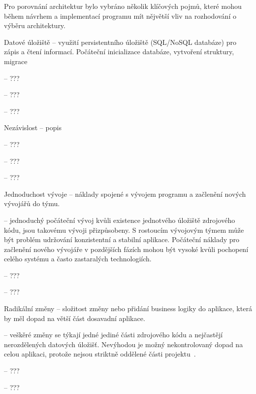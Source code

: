 Pro porovnání architektur bylo vybráno několik klíčových pojmů, které mohou během návrhem a implementací programu mít nějvětší vliv na rozhodování o výběru architektury.


\begin{dl}
   \item[Datové úložiště] – využití persistentního úložiště (SQL/NoSQL databáze) pro zápis a čtení informací.
   Počáteční inicializace databáze, vytvoření struktury, migrace
\end{dl}
\begin{ul}
   \item {} – ???
   \item {} – ???
   \item {} – ???
\end{ul}

\begin{dl}
   \item[Nezávislost] – popis
\end{dl}
\begin{ul}
   \item {} – ???
   \item {} – ???
   \item {} – ???
\end{ul}

\begin{dl}
   \item[Jednoduchost vývoje] – náklady spojené s vývojem programu a začlenění nových vývojářů do týmu.
\end{dl}
\begin{ul}
   \item {} – jednoduchý počáteční vývoj kvůli existence jednotvého úložiště zdrojového kódu,  jsou takovému vývoji přizpůsobeny.
   S rostoucím vývojovým týmem může být problém udržování konzistentní a stabilní aplikace.
   Počáteční náklady pro začlenění nového vývojáře v pozdějších fázích mohou být vysoké kvůli pochopení celého systému a často zastaralých technologiích.~\cite{msachris}
   \item {} – ???
   \item {} – ???
\end{ul}

\begin{dl}
   \item[Radikální změny] – složitost změny nebo přidání business logiky do aplikace, která by měl dopad na větší část dosavadní aplikace.
\end{dl}
\begin{ul}
   \item {} – veškěré změny se týkají jedné jediné části zdrojového kódu a nejčastějí nerozdělených datových úložišť.
   Nevýhodou je možný nekontrolovaný dopad na celou aplikaci, protože nejsou striktně oddělené části projektu~\cite{msachris}.
   \item {} – ???
   \item {} – ???
\end{ul}

